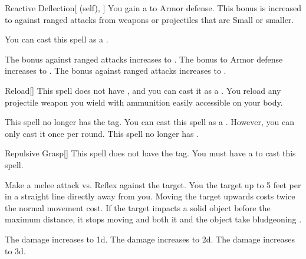 \lowercase{\hypertarget{spell:Reactive Deflection}{}}\label{spell:Reactive Deflection}
\begin{attuneability}[Rank 1]{\hypertarget{spell:Reactive Deflection}{Reactive Deflection}}[ (self), ]
You gain a   to Armor defense.
This bonus is increased to  against  ranged attacks from weapons or projectiles that are Small or smaller.

You can cast this spell as a .

\rankline
{} The bonus against ranged attacks increases to .
 The bonus to Armor defense increases to .
 The bonus against ranged attacks increases to .
\end{attuneability}
\vspace{0.25em}



\lowercase{\hypertarget{spell:Reload}{}}\label{spell:Reload}
\begin{freeability}[Rank 1]{\hypertarget{spell:Reload}{Reload}}[]
This spell does not have , and you can cast it as a .
You reload any projectile weapon you wield with ammunition easily accessible on your body.

\rankline
{} This spell no longer has the  tag.
 You can cast this spell as a .
However, you can only cast it once per round.
 This spell no longer has .
\end{freeability}
\vspace{0.25em}



\lowercase{\hypertarget{spell:Repulsive Grasp}{}}\label{spell:Repulsive Grasp}
\begin{freeability}[Rank 1]{\hypertarget{spell:Repulsive Grasp}{Repulsive Grasp}}[]
This spell does not have the  tag.
You must have a  to cast this spell.

Make a melee attack vs. Reflex against the target.
\hit You  the target up to 5 feet per  in a straight line directly away from you.
Moving the target upwards costs twice the normal movement cost.
If the target impacts a solid object before the maximum distance, it stops moving and both it and the object take bludgeoning .

\rankline
{} The damage increases to  \plus1d.
 The damage increases to  \plus2d.
 The damage increases to  \plus3d.
\end{freeability}
\vspace{0.25em}



